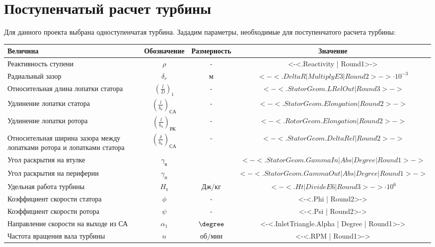 \section{Поступенчатый расчет турбины}
Для данного проекта выбрана одноступенчатая турбина.
Зададим параметры, необходимые для поступенчатого расчета турбины:

\begin{center}
	\begin{longtable}{|p{4cm}|c|c|c|}
		\hline
		\textbf{Величина} & \textbf{Обозначение} & \textbf{Размерность} & \textbf{Значение} \\ \hline
			Реактивность ступени & $\rho$ & - & <-<.Reactivity | Round1>->  \\ \hline
			Радиальный зазор & $\delta_r$ & м & $<-<.DeltaR | MultiplyE3 | Round2>-> \cdot 10^{-3}$ \\ \hline
			Относительная длина лопатки статора & $\left( \frac{l}{D} \right)_1$ & - & $<-<.StatorGeom.LRelOut | Round3>->$ \\ \hline
			Удлинение лопатки статора & $\left( \frac{l}{b_a} \right)_{СА}$ & - & $<-<.StatorGeom.Elongation | Round2>->$ \\ \hline
			Удлинение лопатки ротора & $\left( \frac{l}{b_a} \right)_{РК}$ & - & $<-<.RotorGeom.Elongation | Round2>->$ \\ \hline
			Относительная ширина зазора между лопатками ротора и лопатками статора & $\left( \frac{\delta}{b_a} \right)_{СА}$ & - & $<-<.StatorGeom.DeltaRel | Round2>->$ \\ \hline
			Угол раскрытия на втулке & $\gamma_{в}$ & \degree & $<-<.StatorGeom.GammaIn | Abs | Degree | Round1>->$ \\ \hline
			Угол раскрытия на периферии & $\gamma_{п}$ & \degree & $<-<.StatorGeom.GammaOut | Abs | Degree | Round1>->$ \\ \hline
			Удельная работа турбины & $H_т$ & Дж/кг & $<-<.Ht | DivideE6 | Round3>-> \cdot 10^6$ \\ \hline
			Коэффициент скорости статора & $\phi$ & - & <-<.Phi | Round2>-> \\ \hline
			Коэффициент скорости ротора & $\psi$ & - & <-<.Psi | Round2>-> \\ \hline
			Направление скорости на выходе из СА & $\alpha_1$ & $\degree$ & <-<.InletTriangle.Alpha | Degree | Round1>-> \\ \hline
			Частота вращения вала турбины & $n$ & $об/мин$ & <-<.RPM | Round1>-> \\ \hline
	\end{longtable}
\end{center}

